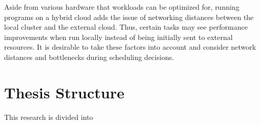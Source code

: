 \begin{description}[style=nextline]
    \item [Optimized Scheduling]
    Aside from various hardware that workloads can be optimized for, running programs on a hybrid cloud adds the issue of networking distances between the local cluster and the external cloud. Thus, certain tasks may see performance improvements when run locally instead of being initially sent to external resources. It is desirable to take these factors into account and consider network distances and bottlenecks during scheduling decisions.

\end{description}


\section*{Thesis Structure}
\label{structure}

This research is divided into 